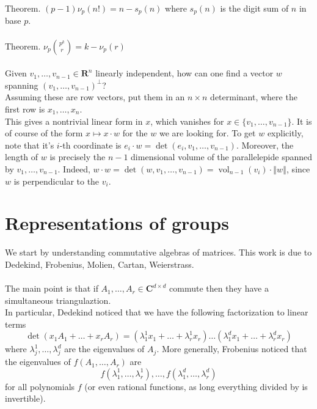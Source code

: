 \documentclass[english]{article}
\newcommand\norm[1]{\left\Vert {#1}\right\Vert }
\def\C{\mathbf{C}}
\def\R{\mathbf{R}}
\DeclareMathOperator\vol{vol}
\begin{document}
Theorem. $(p-1)\nu_p(n!)=n-s_p(n)$ where $s_p(n)$ is the digit sum of $n$ in base $p$.
\\\\
Theorem. $\nu_p{p^k\choose r}=k-\nu_p(r)$
\\\\
Given $v_1,\dots,v_{n-1}\in\R^n$ linearly independent, how can one find a vector $w$ spanning $(v_1,\dots,v_{n-1})^{\perp}$?\\
Assuming these are row vectors, put them in an $n\times n$ determinant, where the first row is $x_1,\dots,x_n$. \\
This gives a nontrivial linear form in $x$, which vanishes for $x\in\{v_1,\dots,v_{n-1}\}$. It is of course of the form $x\mapsto x\cdot w$ for the $w$ we are looking for. To get $w$ explicitly, note that it's $i$-th coordinate is $e_i\cdot w=\det(e_i,v_1,\dots,v_{n-1})$. Moreover, the length of $w$ is precisely the $n-1$ dimensional volume of the parallelepide spanned by $v_1,\dots,v_{n-1}$. Indeed, $w\cdot w=\det(w,v_1,\dots,v_{n-1})=\vol_{n-1}(v_i)\cdot \norm{w}$, since $w$ is perpendicular to the $v_i$.
\newpage
\section*{Representations of groups}
We start by understanding commutative algebras of matrices. This work is due to Dedekind, Frobenius, Molien, Cartan, Weierstrass.\\\\
The main point is that if $A_1,\dots,A_r\in\C^{d\times d}$ commute then they have a simultaneous triangulaztion. \\
In particular, Dedekind noticed that we have the following factorization to linear terms $$\det(x_1A_1+\dots+x_rA_r)=(\lambda_1^1x_1 +\dots+ \lambda_r^1x_r)\dots (\lambda_1^dx_1 +\dots+ \lambda_r^dx_r)$$ where $\lambda_{j}^1,\dots,\lambda_{j}^d$ are the eigenvalues of $A_j$. More generally, Frobenius noticed that the eigenvalues of $f(A_1,\dots,A_r)$ are $$f(\lambda_1^1,\dots,\lambda_r^1),\dots,f(\lambda_1^d,\dots,\lambda_r^d)$$ for all polynomials $f$ (or even rational functions, as long everything divided by is invertible).
\\\\%
\end{document}
